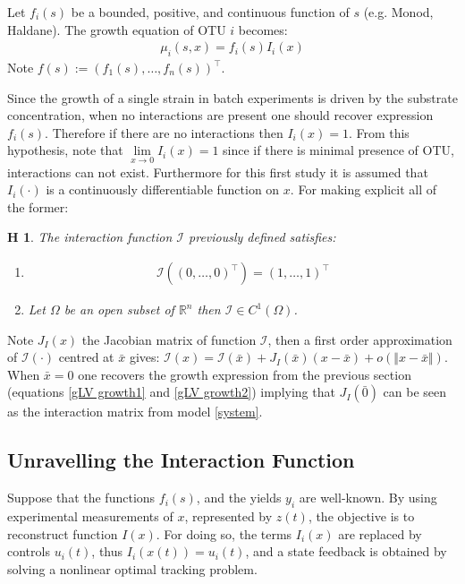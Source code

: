 \documentclass[3p,times]{elsarticle}
\newcommand{\R}{\mathbb{R}}
\newcommand{\I}{\mathcal{I}}
\newtheorem{hypo}{H}
\begin{document}
	Let $f_i(s)$ be a bounded, positive, and continuous function of $s$ (e.g. Monod, Haldane). The growth equation of OTU $i$ becomes:
	\begin{align}
	\mu_i(s,x) = f_i(s)I_i(x)
	\end{align}
	Note $f(s) := (f_1(s),\dots,f_n(s))^\top$.
	\label{growthForm}

Since the growth of a single strain in batch experiments is driven by the substrate concentration, when no interactions are present one should recover expression $f_i(s)$. Therefore if there are no interactions then $I_i(x) = 1$. From this hypothesis, note that $ \lim \limits_{x \rightarrow 0} I_i(x) = 1$ since if there is minimal presence of OTU, interactions can not exist. Furthermore for this first study it is assumed that $I_i(\cdot)$ is a continuously differentiable function on $x$. For making explicit all of the former:

\begin{hypo}
	The interaction function $\I$ previously defined satisfies:
	\begin{enumerate}
		\item\begin{align}
		\I \left( (0,\dots,0)^\top \right) = 
		(1,\dots,1)^\top 
		\end{align}
		\item Let $\Omega$ be an open subset of $ \R^n $ then $\I \in C^1(\Omega)$.
	\end{enumerate} 
\end{hypo}


Note $J_I(x)$ the Jacobian matrix of function $\mathcal{I}$, then a first order approximation of $\I(\cdot)$ centred at $\bar{x}$ gives: $\I(x) = \I(\bar{x}) + J_I(\bar{x})(x-\bar{x}) + o(\Vert x- \bar{x} \Vert)$. When $\bar{x}= 0$ one recovers the growth expression from the previous section (equations \eqref{gLV growth1} and \eqref{gLV growth2}) implying that $J_I(\bar{0})$ can be seen as the interaction matrix from model \eqref{system}.

\subsection{Unravelling the Interaction Function}

Suppose that the functions $f_i(s)$, and the yields $y_i$ are well-known. By using experimental measurements of $x$, represented by $z(t)$, the objective is to reconstruct function $I(x)$. For doing so, the terms $I_i(x)$ are replaced by controls $u_i(t)$, thus $I_i(x(t)) = u_i(t)$,  and a state feedback is obtained by solving a nonlinear optimal tracking problem.	
\end{document}

